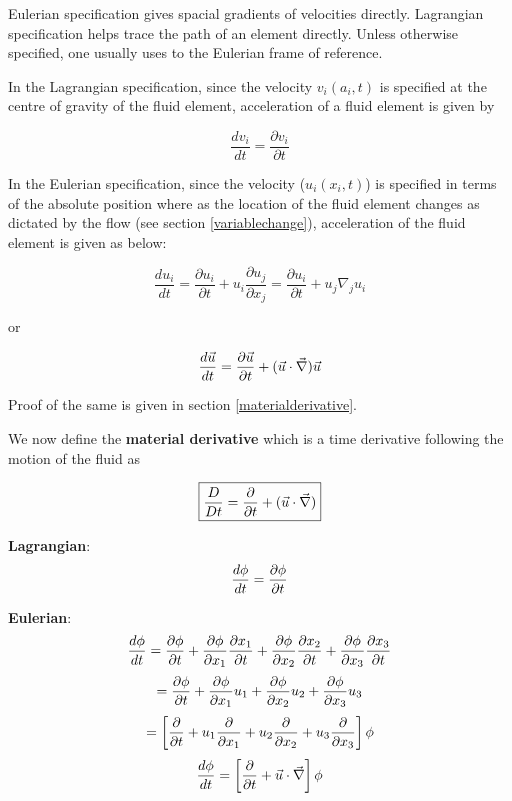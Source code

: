 Eulerian specification gives spacial gradients of velocities directly. Lagrangian specification helps trace the path of an element directly. Unless otherwise specified, one usually uses to the Eulerian frame of reference.

In the Lagrangian specification, since the velocity $v_i(a_i, t)$ is specified at the centre of gravity of the fluid element, acceleration of a fluid element is given by

\begin{equation}
\frac{dv_i}{dt} = \frac{\partial v_i}{\partial t} 
\end{equation} 

In the Eulerian specification, since the velocity ($u_i(x_i,t)$) is specified in terms of the absolute position where as the location of the fluid element changes as dictated by the flow  (see section \ref{variablechange}), acceleration of the fluid element is given as below:

\begin{equation}
\frac{du_i}{dt} = \frac{\partial u_i}{\partial t} + u_i \frac{\partial u_j}{\partial x_j} = \frac{\partial u_i}{\partial t} + u_j \nabla_j u_i 
\end{equation} 

or

\begin{equation}
\frac{d\vec{u}}{dt} = \frac{\partial \vec{u}}{\partial t} + (\vec{u} \cdot \vec{\nabla}) \vec{u} 
\end{equation} 

Proof of the same is given in section \ref{materialderivative}.

We now define the {\bf material derivative} which is a time derivative following the motion of the fluid as 

\begin{equation}
\boxed{\frac{D}{Dt} = \frac{\partial}{\partial t} + (\vec{u} \cdot \vec{\nabla}) }
\end{equation} 


{\bf Lagrangian}:
$$ {d \phi \over d t} = {\partial \phi \over \partial t} $$

{\bf Eulerian}:
$$ {d \phi \over d t} = {\partial \phi \over \partial t} +  {\partial \phi \over \partial x_1} {\partial x_1 \over \partial t} + {\partial \phi \over \partial x_2} {\partial x_2 \over \partial t} + {\partial \phi \over \partial x_3} {\partial x_3 \over \partial t} $$
$$ = {\partial \phi \over \partial t} +  {\partial \phi \over \partial x_1} u_1 + {\partial \phi \over \partial x_2} u_2 + {\partial \phi \over \partial x_3} u_3 $$
$$ = \left[ {\partial \over \partial t} +  u_1 {\partial \over \partial x_1} + u_2 {\partial \over \partial x_2} + u_3 {\partial \over \partial x_3} \right] \phi $$
$$ {d \phi \over d t} = \left[ {\partial \over \partial t} + \vec{u} \cdot \vec{\nabla} \right] \phi $$


